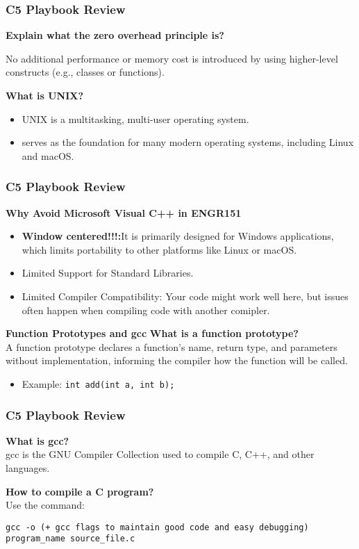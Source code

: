 \documentclass[
	11pt, %
]{beamer}
\begin{document}
\begin{frame}
	\frametitle{C5 Playbook Review}
	\textbf{Explain what the zero overhead principle is?}

	\quad No additional performance or memory cost is introduced by using higher-level constructs (e.g., classes or functions).


	\smallskip


	\textbf{What is UNIX?}
	\begin{itemize}
		\item UNIX is a multitasking, multi-user operating system.
	
		\item serves as the foundation for many modern operating systems, including Linux and macOS.
	\end{itemize}
	
\end{frame}





\begin{frame}
	\frametitle{C5 Playbook Review}
	\textbf{Why Avoid Microsoft Visual C++ in ENGR151}
	\begin{itemize}
		\item \textbf{Window centered!!!:}It is primarily designed for Windows applications, which limits portability to other platforms like Linux or macOS.
		\item Limited Support for Standard Libraries.
		\item Limited Compiler Compatibility: Your code might work well here, but issues often happen when compiling code with another comipler.
	\end{itemize}
	
	
	
	\textbf{Function Prototypes and gcc}
	\textbf{What is a function prototype?} \\
	A function prototype declares a function's name, return type, and parameters without implementation, informing the compiler how the function will be called.
	\begin{itemize}
		\item Example: \texttt{int add(int a, int b);}
	\end{itemize}
	\end{frame}

	\begin{frame}
	\frametitle{C5 Playbook Review}
	\textbf{What is gcc?} \\
	gcc is the GNU Compiler Collection used to compile C, C++, and other languages.
	
	\textbf{How to compile a C program?} \\
	Use the command:
	\begin{center}
	\texttt{gcc -o (+ gcc flags to maintain good code and easy debugging) program\_name source\_file.c}
	\end{center}
	\end{frame}
	
\end{document}
